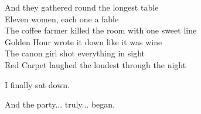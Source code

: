 \begin{lyrics}
And they gathered round the longest table\\
Eleven women, each one a fable\\
The coffee farmer killed the room with one sweet line\\
Golden Hour wrote it down like it was wine\\
The canon girl shot everything in sight\\
Red Carpet laughed the loudest through the night

I finally sat down.

And the party... truly... began.

\end{lyrics}

